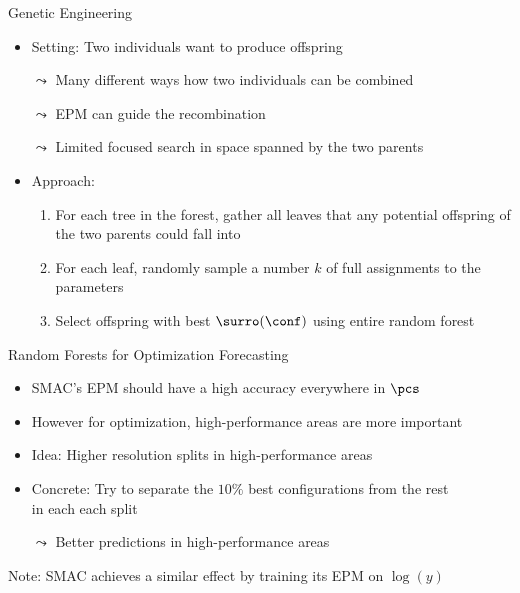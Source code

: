\begin{frame}[c]{Genetic Engineering}

\begin{itemize}
  \item Setting: Two individuals want to produce offspring
  \item[$\leadsto$] Many different ways how two individuals can be combined
  \pause
  \item[$\leadsto$] EPM can guide the recombination
  \pause
  \item[$\leadsto$] Limited focused search in space spanned by the two parents
  \pause
  \medskip
  \item Approach:
  \begin{enumerate}
    \item For each tree in the forest, gather all leaves that any potential offspring of the two parents could fall into
    \pause
    \item For each leaf, randomly sample a number $k$ of full assignments to the parameters
    \pause
    \item Select offspring with best $\surro(\conf)$ using entire random forest
  \end{enumerate}
\end{itemize}

\end{frame}
\begin{frame}[c]{Random Forests for Optimization Forecasting}

\begin{itemize}
  \item SMAC's EPM should have a high accuracy everywhere in $\pcs$
  \item However for optimization, high-performance areas are more important 
  \pause
  \medskip
  \item Idea: Higher resolution splits in high-performance areas
  \pause
  \item Concrete: Try to separate the $10\%$ best configurations from the rest\\ in each each split
  \item[$\leadsto$] Better predictions in high-performance areas
\end{itemize}

\bigskip
\pause
Note: SMAC achieves a similar effect by training its EPM on $\log(y)$

\end{frame}
